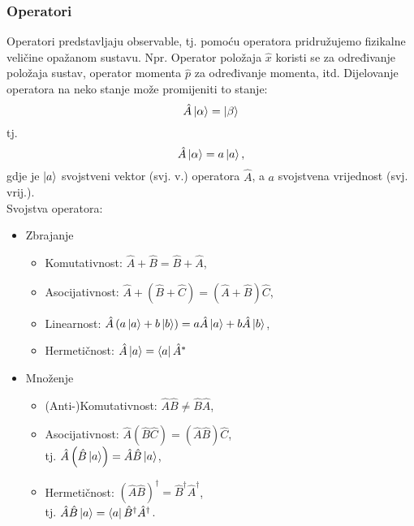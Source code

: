 \documentclass{article}
\numberwithin{equation}{section}
\begin{document}
\subsubsection{Operatori}
Operatori predstavljaju observable, tj. pomoću operatora pridružujemo fizikalne veličine opažanom sustavu. Npr. Operator položaja $\hat{x}$
koristi se za određivanje položaja sustav, operator momenta $\hat{p}$ za određivanje momenta, itd.
Dijelovanje operatora na neko stanje može promijeniti to stanje:
\begin{equation}
	\hat{A}\ket{\alpha} = \ket{\beta}
\end{equation}
tj.
\begin{equation}
	\hat{A}\ket{\alpha} = a \ket{a},
\end{equation}
gdje je $\ket{a}$ svojstveni vektor (svj. v.) operatora $\hat{A}$, a $a$ svojstvena vrijednost (svj. vrij.).\\

Svojstva operatora:
\begin{itemize}
	\item Zbrajanje
	      \begin{itemize}
		      \item Komutativnost: $\hat{A} + \hat{B} = \hat{B} + \hat{A}$,
		      \item Asocijativnost: $\hat{A} + \left(\hat{B} + \hat{C}\right) = \left(\hat{A} + \hat{B} \right) \hat{C}$,
		      \item Linearnost: $\hat{A}\left(a\ket{a}+b\ket{b}\right) = a\hat{A}\ket{a} + b\hat{A}\ket{b}$,
		      \item Hermetičnost: $\hat{A}\ket{a} = \bra{a}\hat{A}^*$
	      \end{itemize}
	\item Množenje
	      \begin{itemize}
		      \item (Anti-)Komutativnost: $\hat{A}\hat{B} \ne \hat{B} \hat{A}$,
		      \item Asocijativnost: $\hat{A}\left(\hat{B}\hat{C}\right) = \left(\hat{A}\hat{B}\right)\hat{C}$,\\
		            tj. $\hat{A}\left(\hat{B}\ket{a}\right)=\hat{A}\hat{B}\ket{a}$,
		      \item Hermetičnost: $\left(\hat{A}\hat{B}\right)^{\dagger} = \hat{B}^{\dagger}\hat{A}^{\dagger}$,\\
		            tj. $\hat{A}\hat{B} \ket{a} = \bra{a} \hat{B}^{\dagger} \hat{A}^{\dagger}$.
	      \end{itemize}

\end{itemize}
\end{document}
